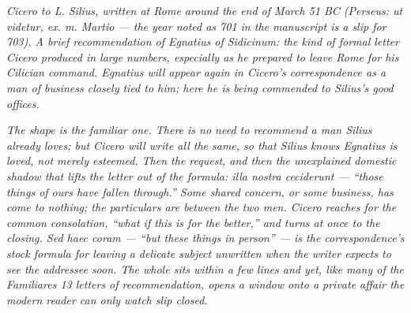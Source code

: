 
\textit{Cicero to L. Silius, written at Rome around the end of
March 51 BC (Perseus: \textit{ut videtur, ex. m. Martio} ---
the year noted as 701 in the manuscript is a slip for 703).
A brief recommendation of Egnatius of Sidicinum: the kind of
formal letter Cicero produced in large numbers, especially as
he prepared to leave Rome for his Cilician command. Egnatius
will appear again in Cicero's correspondence as a man of
business closely tied to him; here he is being commended to
Silius's good offices.}

\textit{The shape is the familiar one. There is no need to
recommend a man Silius already loves; but Cicero will write all
the same, so that Silius knows Egnatius is loved, not merely
esteemed. Then the request, and then the unexplained domestic
shadow that lifts the letter out of the formula: \textit{illa
nostra ceciderunt} --- ``those things of ours have fallen
through.'' Some shared concern, or some business, has come to
nothing; the particulars are between the two men. Cicero
reaches for the common consolation, ``what if this is for the
better,'' and turns at once to the closing. \textit{Sed haec
coram} --- ``but these things in person'' --- is the
correspondence's stock formula for leaving a delicate subject
unwritten when the writer expects to see the addressee soon.
The whole sits within a few lines and yet, like many of the
\textit{Familiares} 13 letters of recommendation, opens a
window onto a private affair the modern reader can only watch
slip closed.}
